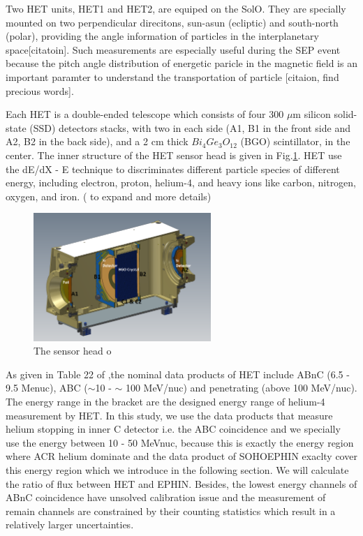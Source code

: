 Two HET units, HET1 and HET2, are equiped on the \ac{SolO}. They are specially mounted on two perpendicular direcitons, sun-asun (ecliptic) and south-north (polar), providing the angle information of particles in the interplanetary space[citatoin]. Such measurements are especially useful during the SEP event because the pitch angle  distribution of energetic paricle in the magnetic field is an important paramter to understand the transportation of particle [citaion, find precious words]. 

Each HET is a double-ended telescope which consists of four 300 $\mu$m silicon solid-state (SSD) detectors stacks, with two in each side (A1, B1 in the front side and A2, B2 in the back side), and a 2 cm thick $Bi_{4}Ge_{3}O_{12}$ (BGO) scintillator, in the center. The inner structure of the HET sensor head is given in Fig.\ref{fig:HET-sensor-head}. HET use the dE/dX - E technique to discriminates different particle species of different energy, including electron, proton, helium-4, and heavy ions like carbon, nitrogen, oxygen, and iron.  ( to expand and more details)



\begin{figure}
    \centering
    \includegraphics[width = 0.6\textwidth]{images/het.png}
    \caption{The sensor head o}
    \label{fig:HET-sensor-head}
\end{figure}



As given in Table 22 of \cite{EPD instruemnt},the nominal data products of HET include ABnC (6.5 - 9.5 Me\/nuc), ABC ($\sim$10 - $\sim$ 100 MeV/nuc) and penetrating (above 100 MeV/nuc). The energy range in the bracket are the designed energy range of helium-4 measurement by HET. In this study, we use the data products that measure helium stopping in inner C detector i.e. the ABC coincidence and we specially use the energy between 10 - 50 MeV\/nuc, because this is exactly the energy region where ACR helium dominate and the data product of SOHO\/EPHIN exaclty cover this energy region which we introduce in the following section. We will calculate the ratio of flux between HET and EPHIN. 
Besides, the lowest energy channels of ABnC coincidence have unsolved calibration issue and the measurement of remain channels are constrained by their counting statistics which result in a relatively larger uncertainties.




